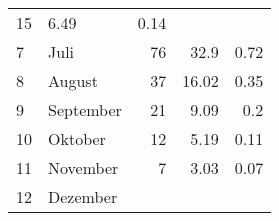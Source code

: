 \begin{longtable}{lXrrr}
       \num{15} &
       \num[round-mode=places,round-precision=2]{6.49} &
         \num[round-mode=places,round-precision=2]{0.14} \\

     7 &
     \multicolumn{1}{X}{ Juli   } &


       \num{76} &
       \num[round-mode=places,round-precision=2]{32.9} &
         \num[round-mode=places,round-precision=2]{0.72} \\

     8 &
     \multicolumn{1}{X}{ August   } &


       \num{37} &
       \num[round-mode=places,round-precision=2]{16.02} &
         \num[round-mode=places,round-precision=2]{0.35} \\

     9 &
     \multicolumn{1}{X}{ September   } &


       \num{21} &
       \num[round-mode=places,round-precision=2]{9.09} &
         \num[round-mode=places,round-precision=2]{0.2} \\

     10 &
     \multicolumn{1}{X}{ Oktober   } &


       \num{12} &
       \num[round-mode=places,round-precision=2]{5.19} &
         \num[round-mode=places,round-precision=2]{0.11} \\

     11 &
     \multicolumn{1}{X}{ November   } &


       \num{7} &
       \num[round-mode=places,round-precision=2]{3.03} &
         \num[round-mode=places,round-precision=2]{0.07} \\

     12 &
     \multicolumn{1}{X}{ Dezember   } &



\end{longtable}
